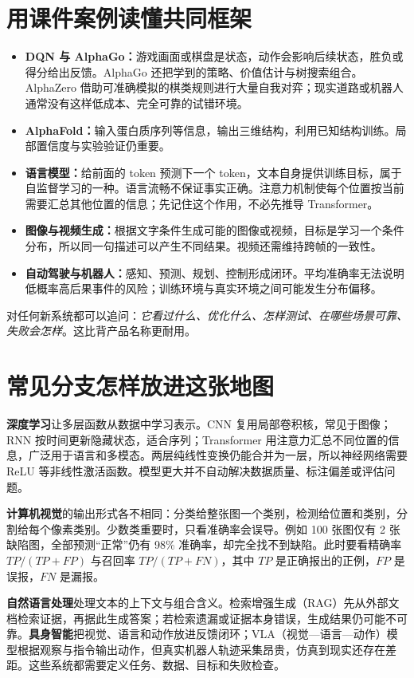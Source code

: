 \documentclass[UTF8,11pt,oneside]{ctexbook}
\begin{document}
\section{用课件案例读懂共同框架}
\begin{itemize}
\item \textbf{DQN 与 AlphaGo：}游戏画面或棋盘是状态，动作会影响后续状态，胜负或得分给出反馈。AlphaGo 还把学到的策略、价值估计与树搜索组合。AlphaZero 借助可准确模拟的棋类规则进行大量自我对弈；现实道路或机器人通常没有这样低成本、完全可靠的试错环境。
\item \textbf{AlphaFold：}输入蛋白质序列等信息，输出三维结构，利用已知结构训练。局部置信度与实验验证仍重要。
\item \textbf{语言模型：}给前面的 token 预测下一个 token，文本自身提供训练目标，属于自监督学习的一种。语言流畅不保证事实正确。注意力机制使每个位置按当前需要汇总其他位置的信息；先记住这个作用，不必先推导 Transformer。
\item \textbf{图像与视频生成：}根据文字条件生成可能的图像或视频，目标是学习一个条件分布，所以同一句描述可以产生不同结果。视频还需维持跨帧的一致性。
\item \textbf{自动驾驶与机器人：}感知、预测、规划、控制形成闭环。平均准确率无法说明低概率高后果事件的风险；训练环境与真实环境之间可能发生分布偏移。
\end{itemize}
对任何新系统都可以追问：\emph{它看过什么、优化什么、怎样测试、在哪些场景可靠、失败会怎样}。这比背产品名称更耐用。

\section{常见分支怎样放进这张地图}
\textbf{深度学习}让多层函数从数据中学习表示。CNN 复用局部卷积核，常见于图像；RNN 按时间更新隐藏状态，适合序列；Transformer 用注意力汇总不同位置的信息，广泛用于语言和多模态。两层纯线性变换仍能合并为一层，所以神经网络需要 ReLU 等非线性激活函数。模型更大并不自动解决数据质量、标注偏差或评估问题。

\textbf{计算机视觉}的输出形式各不相同：分类给整张图一个类别，检测给位置和类别，分割给每个像素类别。少数类重要时，只看准确率会误导。例如 100 张图仅有 2 张缺陷图，全部预测“正常”仍有 98\% 准确率，却完全找不到缺陷。此时要看精确率 $TP/(TP+FP)$ 与召回率 $TP/(TP+FN)$，其中 $TP$ 是正确报出的正例，$FP$ 是误报，$FN$ 是漏报。

\textbf{自然语言处理}处理文本的上下文与组合含义。检索增强生成（RAG）先从外部文档检索证据，再据此生成答案；若检索遗漏或证据本身错误，生成结果仍可能不可靠。\textbf{具身智能}把视觉、语言和动作放进反馈闭环；VLA（视觉—语言—动作）模型根据观察与指令输出动作，但真实机器人轨迹采集昂贵，仿真到现实还存在差距。这些系统都需要定义任务、数据、目标和失败检查。
\end{document}
